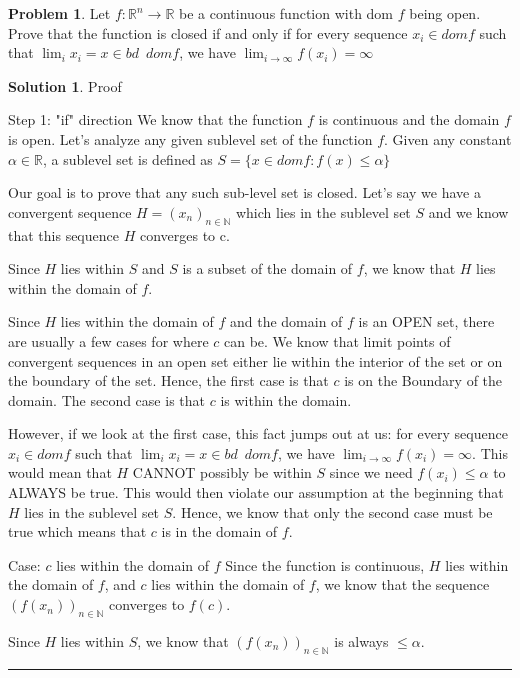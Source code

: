 \documentclass{article}
\theoremstyle{definition}
\newtheorem{problem}{Problem}
\def\fline{\rule{0.75\linewidth}{0.5pt}}
\newcommand{\finishline}{\begin{center}\fline\end{center}}
\newtheorem*{solution*}{Solution}
\newenvironment{solution}{\begin{solution*}}{{\finishline} \end{solution*}}
\begin{document}
\begin{problem}
Let $f : \mathbb{R}^n \rightarrow \mathbb{R}$ be a continuous function with dom $f$ being open. Prove that the function is closed if and only if for every sequence $x_i \in dom f$ such that $\lim_{i} x_i = x \in bd \enspace dom f$, we have $\lim_{i\to\infty} f(x_i) = \infty$

\begin{solution} Proof 

Step 1: "if" direction \newline 
We know that the function  $f$ is continuous and the domain $f$ is open. Let's analyze any given sublevel set of the function $f$. Given any constant $\alpha \in \mathbb{R}$, a sublevel set is defined as $S = \{x \in dom f : f(x) \leq \alpha \}$

Our goal is to prove that any such sub-level set is closed. Let's say we have a convergent sequence $H = (x_n)_{n \in \mathbb{N}}$ which lies in the sublevel set $S$ and we know that this sequence $H$ converges to c. 

Since $H$ lies within $S$ and $S$ is a subset of the domain of $f$, we know that $H$ lies within the domain of $f$. 

Since $H$ lies within the domain of $f$ and the domain of $f$ is an OPEN set, there are usually a few cases for where $c$ can be. We know that limit points of convergent sequences in an open set either lie within the interior of the set or on the boundary of the set. Hence, the first case is that $c$ is on the Boundary of the domain. The second case is that $c$ is within the domain. 

However, if we look at the first case, this fact jumps out at us: for every sequence $x_i \in dom f$ such that $\lim_{i} x_i = x \in bd \enspace dom f$, we have $\lim_{i\to\infty} f(x_i) = \infty$. This would mean that $H$ CANNOT possibly be within $S$ since we need $f(x_i) \leq \alpha$ to ALWAYS be true. This would then violate our assumption at the beginning that $H$ lies in the sublevel set $S$. Hence, we know that only the second case must be true which means that $c$ is in the domain of $f$.   \newline 

Case: $c$ lies within the domain of $f$ \newline 
Since the function is continuous, $H$ lies within the domain of $f$, and $c$ lies within the domain of $f$, we know that the sequence $(f(x_n))_{n \in \mathbb{N}}$ converges to $f(c)$. 

Since $H$ lies within $S$, we know that $(f(x_n))_{n \in \mathbb{N}}$ is always $\leq \alpha$. \newline 



\end{solution}
\end{problem}
\end{document}
